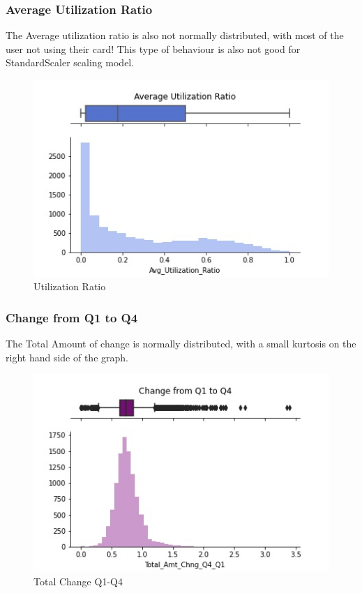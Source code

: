 \documentclass{homeworg}
\begin{document}
\subsubsection{Average Utilization Ratio}
The Average utilization ratio is also not normally distributed, with most of the user not using their card! This type of behaviour is also not good for StandardScaler scaling model.
\begin{figure}[H]
    \centering
    \includegraphics[scale=0.7]{figure/HG_Util_ratio.jpg}
    \caption{Utilization Ratio}
    \label{fig:utilratio}
\end{figure}
\par
\subsubsection{Change from Q1 to Q4}
The Total Amount of change is normally distributed, with a small kurtosis on the right hand side of the graph.
\begin{figure}[H]
    \centering
    \includegraphics[scale=0.7]{figure/HG_TotalChangeQ1-Q4.jpg}
    \caption{Total Change Q1-Q4}
    \label{fig:Q4Q1Change}
\end{figure}
\par
\end{document}
